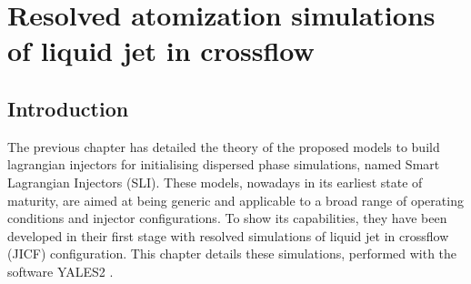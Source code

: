 \chapter{Resolved atomization simulations of liquid jet in crossflow}

\label{ch5:jicf_resolved_simulations}

%
%
%	
%	
%	
%	
%	
%	
%	
%		
%			
%			
%	
%		
%	
%		
%			
%		
%
%

\section{Introduction}

The previous chapter has detailed the theory of the proposed models to build lagrangian injectors for initialising dispersed phase simulations, named Smart Lagrangian Injectors (SLI). These models, nowadays in its earliest state of maturity, are aimed at being generic and applicable to a broad range of operating conditions and injector configurations. To show its capabilities, they have been developed in their first stage with resolved simulations of liquid jet in crossflow (JICF) configuration. This chapter details these simulations, performed with the software YALES2 . %

